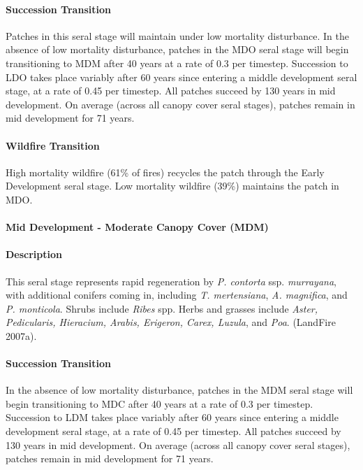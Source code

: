 \paragraph*{Succession Transition} Patches in this seral stage will maintain under low mortality disturbance. In the absence of low mortality disturbance, patches in the MDO seral stage will begin transitioning to MDM after 40 years at a rate of 0.3 per timestep. Succession to LDO takes place variably after 60 years since entering a middle development seral stage, at a rate of 0.45 per timestep. All patches succeed by 130 years in mid development.  On average (across all canopy cover seral stages), patches remain in mid development for 71 years.

\paragraph*{Wildfire Transition} High mortality wildfire (61\% of fires) recycles the patch through the Early Development seral stage. Low mortality wildfire (39\%) maintains the patch in MDO.

\noindent\hrulefill

\paragraph*{Mid Development - Moderate Canopy Cover (MDM)}

\paragraph*{Description} This seral stage represents rapid regeneration by \emph{P. contorta} ssp. \emph{murrayana}, with additional conifers coming in, including \emph{T. mertensiana}, \emph{A. magnifica}, and \emph{P. monticola}. Shrubs include \emph{Ribes} spp. Herbs and grasses include \emph{Aster, Pedicularis, Hieracium, Arabis, Erigeron, Carex, Luzula}, and \emph{Poa}. (LandFire 2007a).

\paragraph*{Succession Transition} In the absence of low mortality disturbance, patches in the MDM seral stage will begin transitioning to MDC after 40 years at a rate of 0.3 per timestep. Succession to LDM takes place variably after 60 years since entering a middle development seral stage, at a rate of 0.45 per timestep. All patches succeed by 130 years in mid development.  On average (across all canopy cover seral stages), patches remain in mid development for 71 years.
 
